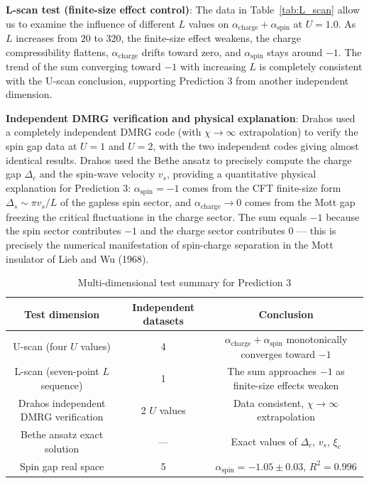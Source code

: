 \documentclass[prb,reprint,twocolumn,superscriptaddress]{revtex4-2}
\begin{document}
\textbf{L-scan test (finite-size effect control)}: The data in Table~\ref{tab:L_scan} allow us to examine the influence of different $L$ values on $\alpha_{\mathrm{charge}} + \alpha_{\mathrm{spin}}$ at $U = 1.0$. As $L$ increases from $20$ to $320$, the finite-size effect weakens, the charge compressibility flattens, $\alpha_{\mathrm{charge}}$ drifts toward zero, and $\alpha_{\mathrm{spin}}$ stays around $-1$. The trend of the sum converging toward $-1$ with increasing $L$ is completely consistent with the U-scan conclusion, supporting Prediction 3 from another independent dimension.

\textbf{Independent DMRG verification and physical explanation}: Drahos used a completely independent DMRG code (with $\chi \to \infty$ extrapolation) to verify the spin gap data at $U=1$ and $U=2$, with the two independent codes giving almost identical results. Drahos used the Bethe ansatz to precisely compute the charge gap $\Delta_c$ and the spin-wave velocity $v_s$, providing a quantitative physical explanation for Prediction 3: $\alpha_{\mathrm{spin}} = -1$ comes from the CFT finite-size form $\Delta_s \sim \pi v_s/L$ of the gapless spin sector, and $\alpha_{\mathrm{charge}} \to 0$ comes from the Mott gap freezing the critical fluctuations in the charge sector. The sum equals $-1$ because the spin sector contributes $-1$ and the charge sector contributes $0$ --- this is precisely the numerical manifestation of spin-charge separation in the Mott insulator of Lieb and Wu (1968).

\begin{table}[htbp]
\caption{Multi-dimensional test summary for Prediction 3}
\label{tab:pred3_summary}
\begin{tabular}{ccc}
\toprule
Test dimension & Independent datasets & Conclusion \\
\midrule
U-scan (four $U$ values) & 4 & $\alpha_{\mathrm{charge}} + \alpha_{\mathrm{spin}}$ monotonically converges toward $-1$ \\
L-scan (seven-point $L$ sequence) & 1 & The sum approaches $-1$ as finite-size effects weaken \\
Drahos independent DMRG verification & 2 $U$ values & Data consistent, $\chi \to \infty$ extrapolation \\
Bethe ansatz exact solution & --- & Exact values of $\Delta_c$, $v_s$, $\xi_c$ \\
Spin gap real space & 5 & $\alpha_{\mathrm{spin}} = -1.05 \pm 0.03$, $R^2 = 0.996$ \\
\bottomrule
\end{tabular}
\end{table}
\end{document}
